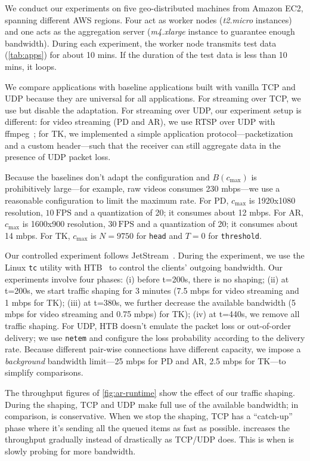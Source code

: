 We conduct our experiments on five geo-distributed machines from Amazon EC2,
spanning different AWS regions. Four act as worker nodes (\textit{t2.micro}
instances) and one acts as the aggregation server (\textit{m4.xlarge} instance
to guarantee enough bandwidth). During each experiment, the worker node
transmits test data (\autoref{tab:apps}) for about 10 mins. If the duration of
the test data is less than 10 mins, it loops.

We compare \sysname{} applications with baseline applications built with vanilla
TCP and UDP because they are universal for all applications. For streaming over
TCP, we use \sysname{} but disable the adaptation. For streaming over UDP, our
experiment setup is different: for video streaming (PD and AR), we use RTSP over
UDP with ffmpeg~\cite{bellard2012ffmpeg}; for TK, we implemented a simple
application protocol---packetization and a custom header---such that the
receiver can still aggregate data in the presence of UDP packet loss.

Because the baselines don't adapt the configuration and $B(c_{\max})$ is
prohibitively large---for example, raw videos consumes 230 mbps---we use a
reasonable configuration to limit the maximum rate. For PD, $c_{\max}$ is
1920x1080 resolution, \(10~\text{FPS}\) and a quantization of 20; it consumes
about 12 mbps. For AR, $c_{\max}$ is 1600x900 resolution, \(30~\text{FPS}\) and
a quantization of 20; it consumes about 14 mbps.  For TK, $c_{\max}$ is $N=9750$
for \texttt{head} and $T=0$ for \texttt{threshold}.

Our controlled experiment follows JetStream~\cite{rabkin2014aggregation}. During
the experiment, we use the Linux \texttt{tc} utility with HTB~\cite{lartc, htb}
to control the clients' outgoing bandwidth. Our experiments involve four phases:
(i) before t=200s, there is no shaping; (ii) at t=200s, we start traffic shaping
for 3 minutes (7.5 mbps for video streaming and 1 mbps for TK); (iii) at t=380s,
we further decrease the available bandwidth (5 mbps for video streaming and 0.75
mbps) for TK); (iv) at t=440s, we remove all traffic shaping. For UDP, HTB
doesn't emulate the packet loss or out-of-order delivery; we use \texttt{netem}
and configure the loss probability according to the delivery rate. Because
different pair-wise connections have different capacity, we impose a
\textit{background} bandwidth limit---25 mbps for PD and AR, 2.5 mbps for
TK---to simplify comparisons.

The throughput figures of \autoref{fig:ar-runtime} show the effect of our
traffic shaping. During the shaping, TCP and UDP make full use of the available
bandwidth; in comparison, \sysname{} is conservative. When we stop the shaping,
TCP has a ``catch-up'' phase where it's sending all the queued items as fast as
possible. \sysname{} increases the throughput gradually instead of drastically
as TCP/UDP does. This is when \sysname{} is slowly probing for more bandwidth.

